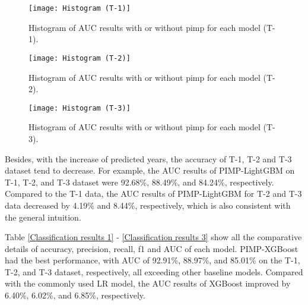 \documentclass[review]{elsarticle}
\begin{document}
\begin{figure}[H]
    \centering
    \texttt{[image: Histogram (T-1)]}
    \caption{Histogram of AUC results with or without pimp for each model (T-1).}
    \label{fig: Histogram of AUC 1}
\end{figure}

\begin{figure}[H]
    \centering
    \texttt{[image: Histogram (T-2)]}
    \caption{Histogram of AUC results with or without pimp for each model (T-2).}
    \label{fig: Histogram of AUC 2}
\end{figure}

\begin{figure}[H]
    \centering
    \texttt{[image: Histogram (T-3)]}
    \caption{Histogram of AUC results with or without pimp for each model (T-3).}
    \label{fig: Histogram of AUC 3}
\end{figure}

Besides, with the increase of predicted years, the accuracy of T-1, T-2 and T-3 dataset tend to decrease. For example, the AUC results of PIMP-LightGBM on T-1, T-2, and T-3 dataset were 92.68\%, 88.49\%, and 84.24\%, respectively. Compared to the T-1 data, the AUC results of PIMP-LightGBM for T-2 and T-3 data decreased by 4.19\% and 8.44\%, respectively, which is also consistent with the general intuition.

Table \ref{Classification results 1} - \ref{Classification results 3} show all the comparative details of accuracy, precision, recall, f1 and AUC of each model. PIMP-XGBoost had the best performance, with AUC of 92.91\%, 88.97\%, and 85.01\% on the T-1, T-2, and T-3 dataset, respectively, all exceeding other baseline models. Compared with the commonly used LR model, the AUC results of XGBoost improved by 6.40\%, 6.02\%, and 6.85\%, respectively.
\end{document}
